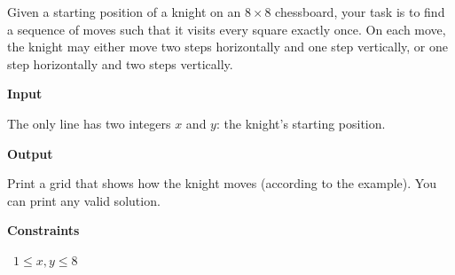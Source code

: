 Given a starting position of a knight on an $8 \times 8$ chessboard, your task is to find a sequence of moves such that it visits every square exactly once.
On each move, the knight may either move two steps horizontally and one step vertically, or one step horizontally and two steps vertically.

\vspace{0.3cm}\noindent\textbf{Input}

The only line has two integers $x$ and $y$: the knight's starting position.

\vspace{0.3cm}\noindent\textbf{Output}

Print a grid that shows how the knight moves (according to the example). You can print any valid solution.

\vspace{0.3cm}\noindent\textbf{Constraints}

\textbullet\ $1 \le x,y \le 8$